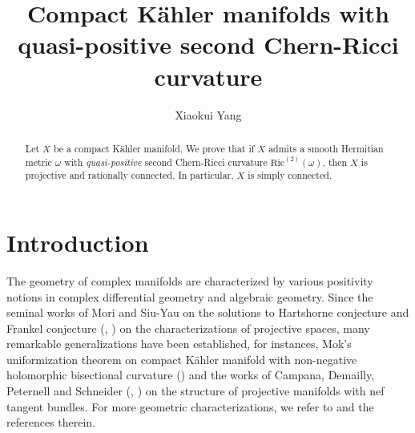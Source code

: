 \documentclass[11pt]{amsart}
\title{Compact K\"ahler manifolds with quasi-positive second Chern-Ricci curvature}
\author{Xiaokui Yang}
\theoremstyle{plain}
\theoremstyle{definition}
\renewcommand{\>}{\rightarrow}
\numberwithin{equation}{section} %
\begin{document}
	
	\begin{abstract} Let $X$ be a compact K\"ahler manifold. We prove that if $X$ admits a smooth Hermitian metric $\omega$ with \emph{quasi-positive} second Chern-Ricci curvature $\mathrm{Ric}^{(2)}(\omega)$, then $X$ is projective and rationally connected. In particular, $X$ is simply connected.
	\end{abstract}
	
	
	\maketitle
	
	\tableofcontents
	
	\vspace{-0.2cm}
	
	\section{Introduction}
    The geometry of complex manifolds are characterized by various positivity notions in complex differential geometry and algebraic geometry. Since the seminal works of Mori   and Siu-Yau on the solutions to
	Hartshorne
	conjecture   and Frankel conjecture
	(\cite{Mori1979}, \cite{SiuYau1980}) on the characterizations of projective spaces,   many remarkable generalizations  have been
	established,   for instances, Mok's uniformization theorem on compact K\"ahler manifold
	with non-negative holomorphic bisectional curvature (\cite{Mok1988}) and  the  works of Campana,
	Demailly, Peternell and Schneider (\cite{CampanaPeternell1991},
	\cite{DemaillyPeternellSchneider1994})  on the
	structure of projective manifolds with nef tangent bundles. For more geometric characterizations, we refer to \cite{Mok1988,CampanaPeternell1991,DemaillyPeternellSchneider1994,DemaillyPeternellSchneider2001,Wu2002,Chau2012,LiWuZheng2013,Liu2014b,FengLiuWan2017,HuangLeeTamTong2018,NiZheng2019b,Liu2019,LiOuYang2019,LiuOuYang2020} and the references therein.\\
	
\end{document}
